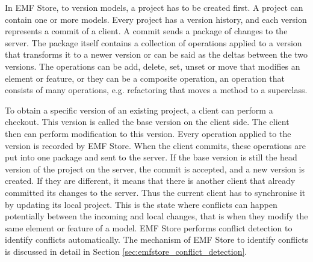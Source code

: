 In EMF Store, to version models, a project has to be created first. A project can contain one or more models. Every project has a version history, and each version represents a commit of a client. A commit sends a package of changes to the server. The package itself contains a collection of operations applied to a version that transforms it to a newer version or can be said as the deltas between the two versions. The operations can be add, delete, set, unset or move that modifies an element or feature, or they can be a composite operation, an operation that consists of many operations, e.g. refactoring that moves a method to a superclass.

To obtain a specific version of an existing project, a client can perform a checkout. This version is called the base version on the client side. The client then can perform modification to this version. Every operation applied to the version is recorded by EMF Store. When the client commits, these operations are put into one package and sent to the server. If the base version is still the head version of the project on the server, the commit is accepted, and a new version is created. If they are different, it means that there is another client that already committed its changes to the server. Thus the current client has to synchronise it by updating its local project. This is the state where conflicts can happen potentially between the incoming and local changes, that is when they modify the same element or feature of a model. EMF Store performs conflict detection to identify conflicts automatically. The mechanism of EMF Store to identify conflicts is discussed in detail in Section \ref{sec:emfstore_conflict_detection}.

